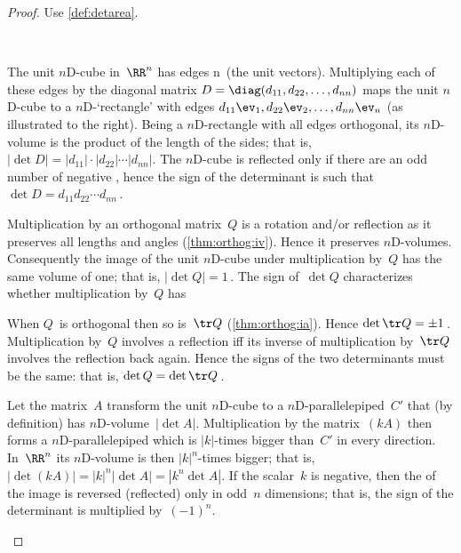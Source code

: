 \begin{proof} Use \cref{def:detarea}.
\begin{description}
\item[\ref{thm:basicdet:i}]\ \\
\begin{figbox}{\def\unithouseviews{30}}%
The unit $n$D-cube in~\(\RR^n\) has edges \hlist\ev n\ (the unit vectors).
Multiplying each of these edges by the diagonal matrix \(D=\diag(d_{11},d_{22},\ldots,d_{nn})\) maps the unit $n$D-cube to a $n$D-`rectangle' with edges \(d_{11}\ev_1,d_{22}\ev_2,\ldots,d_{nn}\ev_n\) (as illustrated to the right).
Being a $n$D-rectangle with all edges orthogonal, its $n$D-volume is the product of the length of the sides; that is, \(|\det D|=|d_{11}|\cdot|d_{22}|\cdots |d_{nn}|\).
The $n$D-cube is reflected only if there are an odd number of negative , hence the sign of the determinant is such that \(\det D=d_{11}d_{22}\cdots d_{nn}\)\,.

\end{figbox}

\item[\ref{thm:basicdet:ii}]
Multiplication by an orthogonal matrix~\(Q\) is a rotation and/or reflection as it preserves all lengths and angles (\cref{thm:orthog:iv}).
Hence it preserves $n$D-volumes.
Consequently the image of the unit $n$D-cube under multiplication by~\(Q\) has the same volume of one; that is, \(|\det Q|=1\)\,.
The sign of~\(\det Q\) characterizes whether multiplication by~\(Q\) has 

When \(Q\)~is orthogonal then so is~\(\tr Q\) (\cref{thm:orthog:ia}).  
Hence \(\det\tr Q=\pm1\)\,.
Multiplication by~\(Q\) involves a reflection iff its inverse of multiplication by~\(\tr Q\) involves the reflection back again.
Hence the signs of the two determinants must be the same: that is, \(\det Q=\det\tr Q\)\,.

\item[\ref{thm:basicdet:iii}]
Let the matrix~\(A\) transform the unit $n$D-cube to a $n$D-parallelepiped~\(C'\) that  (by definition) has $n$D-volume~\(|\det A|\).
Multiplication by the matrix~\((kA)\) then forms a $n$D-parallelepiped which is \(|k|\)-times bigger than~\(C'\) in every direction.
In~\(\RR^n\) its $n$D-volume is then \(|k|^n\)-times bigger; that is,
\(|\det(kA)|=|k|^n|\det A|=|k^n\det A|\).
If the scalar~\(k\) is negative, then the  of the image is reversed (reflected) only in odd~\(n\) dimensions; that is, the sign of the determinant is multiplied by~\((-1)^n\).


\end{description}
\end{proof}
